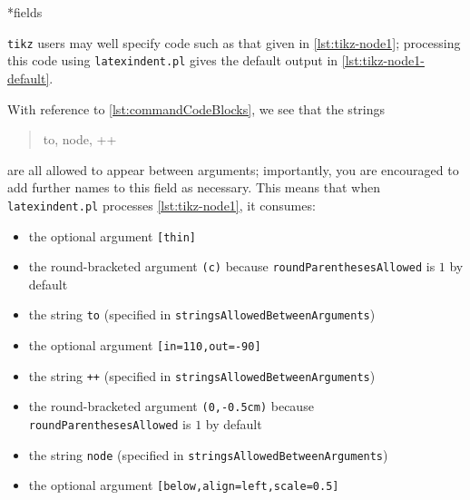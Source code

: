 *{fields}
 \begin{example}
 \texttt{tikz} users may well specify code such as that given in
 \cref{lst:tikz-node1}; processing this code using
 \texttt{latexindent.pl} gives the default output in \cref{lst:tikz-node1-default}.

 \begin{cmhtcbraster}
 \end{cmhtcbraster}

 With reference to \vref{lst:commandCodeBlocks}, we see that the strings
 \begin{quote}
  to, node, ++
 \end{quote}
 are all allowed to appear between arguments; importantly, you are encouraged to add
 further names to this field as necessary. This means that when \texttt{latexindent.pl}
 processes \cref{lst:tikz-node1}, it consumes:
 \begin{itemize}
  \item the optional argument \lstinline![thin]!
  \item the round-bracketed argument \lstinline!(c)! because
        \texttt{roundParenthesesAllowed} is $1$ by default
  \item the string \lstinline!to! (specified in \texttt{stringsAllowedBetweenArguments})
  \item the optional argument \lstinline![in=110,out=-90]!
  \item the string \lstinline!++! (specified in \texttt{stringsAllowedBetweenArguments})
  \item the round-bracketed argument \lstinline!(0,-0.5cm)! because
        \texttt{roundParenthesesAllowed} is $1$ by default
  \item the string \lstinline!node! (specified in
        \texttt{stringsAllowedBetweenArguments})
  \item the optional argument \lstinline![below,align=left,scale=0.5]!
 \end{itemize}
 \end{example}

